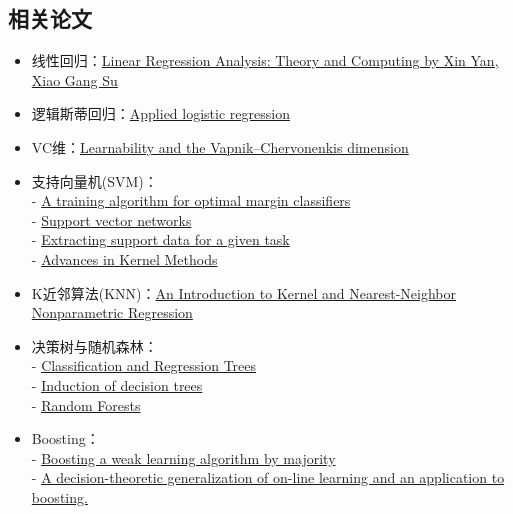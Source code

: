 \documentclass[lang=cn,11pt,a4paper]{eleganttemplate}
\begin{document}
\subsection{相关论文}
\begin{itemize}
    \item 线性回归：\href{https://www.researchgate.net/publication/227373853_Linear_Regression_Analysis_Theory_and_Computing_by_Xin_Yan_Xiao_Gang_Su}{Linear Regression Analysis: Theory and Computing by Xin Yan, Xiao Gang Su} 
    \item 逻辑斯蒂回归：\href{https://www.wiley.com/en-us/Applied+Logistic+Regression\%2C+3rd+Edition-p-9780470582473}{Applied logistic regression} 
    \item VC维：\href{https://dl.acm.org/doi/10.1145/76359.76371}{Learnability and the Vapnik–Chervonenkis dimension} 
    \item 支持向量机(SVM)：\\
    - \href{https://dl.acm.org/doi/10.1145/130385.130401}{A training algorithm for optimal margin classifiers} \\
    - \href{https://dl.acm.org/doi/10.1023/A\%3A1022627411411}{Support vector networks}  \\
    - \href{https://www.aaai.org/Papers/KDD/1995/KDD95-030.pdf}{Extracting support data for a given task} \\
    - \href{https://dl.acm.org/doi/10.1023/A\%3A1022627411411}{Advances in Kernel Methods}
    \item K近邻算法(KNN)：\href{https://citeseerx.ist.psu.edu/viewdoc/download?doi=10.1.1.1010.2854&rep=rep1&type=pdf}{An Introduction to Kernel and Nearest-Neighbor Nonparametric Regression} 
    \item 决策树与随机森林：\\
    - \href{https://onlinelibrary.wiley.com/doi/abs/10.1002/cyto.990080516}{Classification and Regression Trees} \\
    - \href{https://dl.acm.org/doi/10.1023/A\%3A1022643204877}{Induction of decision trees} \\
    - \href{https://link.springer.com/article/10.1023/A:1010933404324}{Random Forests} 
    \item Boosting：\\
    - \href{https://cseweb.ucsd.edu/~yfreund/papers/BoostByMajority.pdf}{Boosting a weak learning algorithm by majority} \\
    - \href{https://www.face-rec.org/algorithms/Boosting-Ensemble/decision-theoretic_generalization.pdf}{A decision-theoretic generalization of on-line learning and an application to boosting.} \\

\end{itemize}
\end{document}
